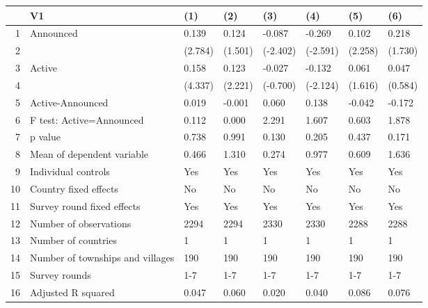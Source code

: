 \begin{table}[ht]
\centering
\begin{tabular}{rlllllll}
  \hline
 & V1 & (1) & (2) & (3) & (4) & (5) & (6) \\ 
  \hline
1 & Announced & 0.139 & 0.124 & -0.087 & -0.269 & 0.102 & 0.218 \\ 
  2 &  & (2.784) & (1.501) & (-2.402) & (-2.591) & (2.258) & (1.730) \\ 
  3 & Active & 0.158 & 0.123 & -0.027 & -0.132 & 0.061 & 0.047 \\ 
  4 &  & (4.337) & (2.221) & (-0.700) & (-2.124) & (1.616) & (0.584) \\ 
  5 & Active-Announced & 0.019 & -0.001 & 0.060 & 0.138 & -0.042 & -0.172 \\ 
  6 & F test: Active=Announced & 0.112 & 0.000 & 2.291 & 1.607 & 0.603 & 1.878 \\ 
  7 & p value & 0.738 & 0.991 & 0.130 & 0.205 & 0.437 & 0.171 \\ 
  8 & Mean of dependent variable & 0.466 & 1.310 & 0.274 & 0.977 & 0.609 & 1.636 \\ 
  9 & Individual controls & Yes & Yes & Yes & Yes & Yes & Yes \\ 
  10 & Country fixed effects & No & No & No & No & No & No \\ 
  11 & Survey round fixed effects & Yes & Yes & Yes & Yes & Yes & Yes \\ 
  12 & Number of observations & 2294 & 2294 & 2330 & 2330 & 2288 & 2288 \\ 
  13 & Number of countries & 1 & 1 & 1 & 1 & 1 & 1 \\ 
  14 & Number of townships and villages & 190 & 190 & 190 & 190 & 190 & 190 \\ 
  15 & Survey rounds & 1-7 & 1-7 & 1-7 & 1-7 & 1-7 & 1-7 \\ 
  16 & Adjusted R squared & 0.047 & 0.060 & 0.020 & 0.040 & 0.086 & 0.076 \\ 
   \hline
\end{tabular}
\end{table}

